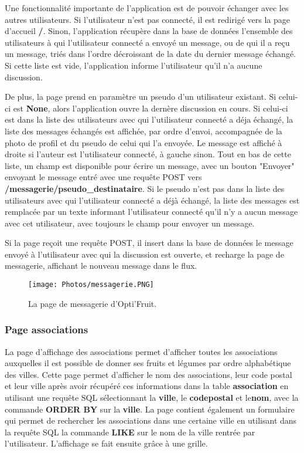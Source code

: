 \documentclass{article}
\begin{document}
Une fonctionnalité importante de l'application est de pouvoir échanger avec les autres utilisateurs. Si l'utilisateur n'est pas connecté, il est redirigé vers la page d'accueil \textbf{/}. Sinon, l'application récupère dans la base de données l'ensemble des utilisateurs à qui l'utilisateur connecté a envoyé un message, ou de qui il a reçu un message, triés dans l'ordre décroissant de la date du dernier message échangé. Si cette liste est vide, l'application informe l'utilisateur qu'il n'a aucune discussion.

De plus, la page prend en paramètre un pseudo d'un utilisateur existant. Si celui-ci est \textbf{None}, alors l'application ouvre la dernère discussion en cours. Si celui-ci est dans la liste des utilisateurs avec qui l'utilisateur connecté a déja échangé, la liste des messages échangés est affichée, par ordre d'envoi, accompagnée de la photo de profil et du pseudo de celui qui l'a envoyée. Le message est affiché à droite si l'auteur est l'utilisateur connecté, à gauche sinon. Tout en bas de cette liste, un champ est disponible pour écrire un message, avec un bouton "Envoyer" envoyant le message entré avec une requête POST vers \textbf{/messagerie/pseudo\_destinataire}.
Si le pseudo n'est pas dans la liste des utilisateurs avec qui l'utilisateur connecté a déjà échangé, la liste des messages est remplacée par un texte informant l'utilisateur connecté qu'il n'y a aucun message avec cet utilisateur, avec toujours le champ pour envoyer un message.

Si la page reçoit une requête POST, il insert dans la base de données le message envoyé à l'utilisateur avec qui la discussion est ouverte, et recharge la page de messagerie, affichant le nouveau message dans le flux.

\begin{figure}[h!]
    \centering
    \texttt{[image: Photos/messagerie.PNG]}
    \caption{La page de messagerie d'Opti'Fruit.}
    \label{fig:my_label}
\end{figure}

\subsubsection{Page associations}
La page d'affichage des associations permet d'afficher toutes les associations auxquelles il est possible de donner ses fruits et légumes par ordre alphabétique des villes. Cette page permet d'afficher le nom des associations, leur code postal et leur ville après avoir récupéré ces informations dans la table \textbf{association} en utilisant une requête SQL sélectionnant la \textbf{ville}, le \textbf{codepostal} et le\textbf{nom}, avec la commande \textbf{ORDER BY} sur la \textbf{ville}. La page contient également un formulaire qui permet de rechercher les associations dans une certaine ville en utilisant dans la requête SQL la commande \textbf{LIKE} sur le nom de la ville rentrée par l'utilisateur. L'affichage se fait ensuite grâce à une grille.
\end{document}
